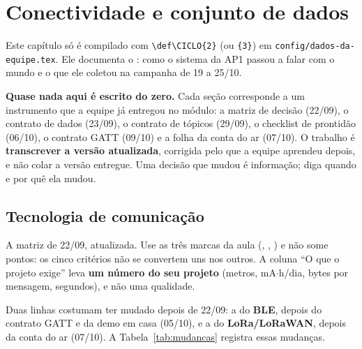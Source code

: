 \chapter{Conectividade e conjunto de dados}
\label{cap:conectividade}
\rubricaJustificativa

\begin{orientacao}
Este capítulo só é compilado com \texttt{\textbackslash def\textbackslash CICLO\{2\}}
(ou \texttt{\{3\}}) em \texttt{config/dados-da-equipe.tex}. Ele documenta
o \moduloDoCiclo: como o sistema da AP1 passou a falar com o mundo e o
que ele coletou na campanha de 19 a 25/10.

\textbf{Quase nada aqui é escrito do zero.} Cada seção corresponde a um
instrumento que a equipe já entregou no módulo: a matriz de decisão
(22/09), o contrato de dados (23/09), o contrato de tópicos (29/09), o
checklist de prontidão (06/10), o contrato GATT (09/10) e a folha da
conta do ar (07/10). O trabalho é \textbf{transcrever a versão
atualizada}, corrigida pelo que a equipe aprendeu depois, e não colar a
versão entregue. Uma decisão que mudou é informação; diga quando e por
quê ela mudou.
\end{orientacao}

\section{Tecnologia de comunicação}
\label{sec:tecnologia}
\rubricaJustificativa

\begin{orientacao}
A matriz de 22/09, atualizada. Use as três marcas da aula (\serve,
\ressalva, \naoserve) e não some pontos: os cinco critérios não se
convertem uns nos outros. A coluna \enquote{O que o projeto exige} leva
\textbf{um número do seu projeto} (metros, mA$\cdot$h/dia, bytes por
mensagem, segundos), e não uma qualidade.

Duas linhas costumam ter mudado depois de 22/09: a do \textbf{BLE},
depois do contrato GATT e da demo em casa (05/10), e a do
\textbf{LoRa/LoRaWAN}, depois da conta do ar (07/10). A
Tabela~\ref{tab:mudancas} registra essas mudanças.
\end{orientacao}

